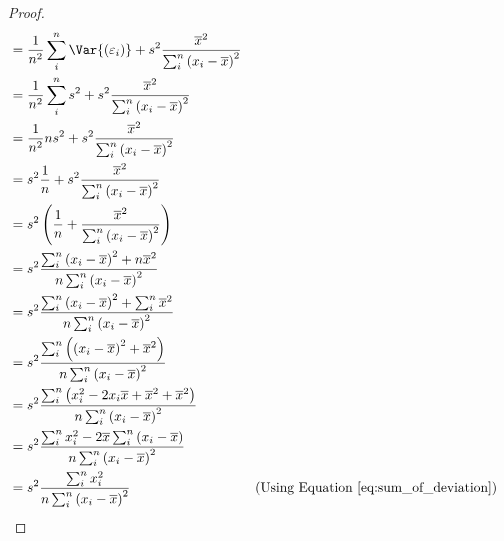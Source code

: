 \documentclass{article}
\begin{document}
\begin{proof}
\begin{align*}
                            & = \frac{1}{n^2} \sum_i^n\Var{\left( \varepsilon_i \right)} + s^2 \frac{\overline{x}^2}{\sum_i^n \left( x_i - \overline{x} \right)^2}                                                                               \\
                            & = \frac{1}{n^2} \sum_i^ns^2 + s^2 \frac{\overline{x}^2}{\sum_i^n \left( x_i - \overline{x} \right)^2}                                                                                                              \\
                            & = \frac{1}{n^2} n s^2 + s^2 \frac{\overline{x}^2}{\sum_i^n \left( x_i - \overline{x} \right)^2}                                                                                                                    \\
                            & = s^2 \frac{1}{n} + s^2 \frac{\overline{x}^2}{\sum_i^n \left( x_i - \overline{x} \right)^2}                                                                                                                        \\
                            & = s^2 \left( \frac{1}{n} + \frac{\overline{x}^2}{\sum_i^n \left( x_i - \overline{x} \right)^2} \right)                                                                                                             \\
                            & = s^2 \frac{\sum_i^n \left( x_i - \overline{x} \right)^2 + n\overline{x}^2}{n \sum_i^n \left( x_i - \overline{x} \right)^2}                                                                                        \\
                            & = s^2 \frac{\sum_i^n \left( x_i - \overline{x} \right)^2 + \sum_i^n \overline{x}^2}{n \sum_i^n \left( x_i - \overline{x} \right)^2}                                                                                \\
                            & = s^2 \frac{\sum_i^n \left( \left( x_i - \overline{x} \right)^2 + \overline{x}^2 \right)}{n \sum_i^n \left( x_i - \overline{x} \right)^2}                                                                          \\
                            & = s^2 \frac{\sum_i^n \left( x_i^2 - 2x_i\overline{x} + \overline{x}^2 + \overline{x}^2 \right)}{n \sum_i^n \left( x_i - \overline{x} \right)^2}                                                                    \\
                            & = s^2 \frac{\sum_i^n x_i^2 - 2\overline{x}\sum_i^n \left( x_i - \overline{x} \right)}{n \sum_i^n \left( x_i - \overline{x} \right)^2}                                                                              \\
                            & = s^2 \frac{\sum_i^n x_i^2}{n \sum_i^n \left( x_i - \overline{x} \right)^2}                                                                                 &  & \text{(Using Equation \ref{eq:sum_of_deviation})}
    \end{align*}
    \endgroup
\end{proof}
\end{document}
